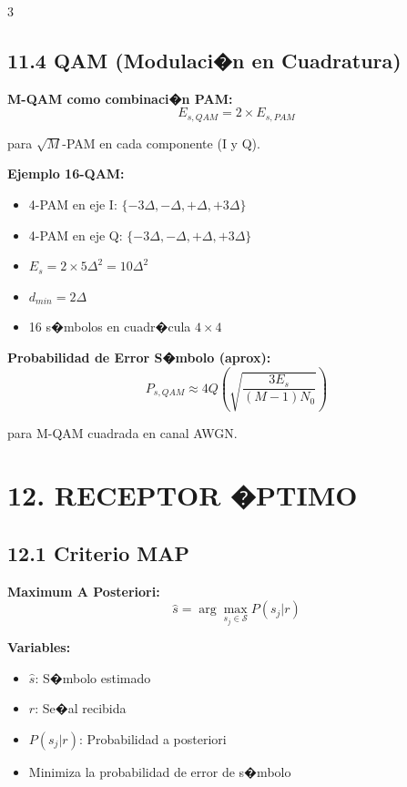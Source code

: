 ﻿\documentclass[8pt,a4paper]{article}
\begin{document}
\begin{multicols}{3}
\vspace{-2mm}
\subsection*{\small 11.4 QAM (Modulaci�n en Cuadratura)}
\vspace{-2mm}

\textbf{M-QAM como combinaci�n PAM:}
\[
E_{s,QAM} = 2 \times E_{s,PAM}
\]

para $\sqrt{M}$-PAM en cada componente (I y Q).

\textbf{Ejemplo 16-QAM:}
\begin{itemize}[leftmargin=*,itemsep=0pt]
    \item 4-PAM en eje I: $\{-3\Delta, -\Delta, +\Delta, +3\Delta\}$
    \item 4-PAM en eje Q: $\{-3\Delta, -\Delta, +\Delta, +3\Delta\}$
    \item $E_s = 2 \times 5\Delta^2 = 10\Delta^2$
    \item $d_{min} = 2\Delta$
    \item 16 s�mbolos en cuadr�cula $4\times4$
\end{itemize}

\textbf{Probabilidad de Error S�mbolo (aprox):}
\[
P_{s,QAM} \approx 4Q\left(\sqrt{\frac{3E_s}{(M-1)N_0}}\right)
\]

para M-QAM cuadrada en canal AWGN.

\vspace{-2mm}
\section*{\color{sectioncolor}\normalsize 12. RECEPTOR �PTIMO}
\vspace{-3mm}

\subsection*{\small 12.1 Criterio MAP}
\vspace{-2mm}

\textbf{Maximum A Posteriori:}
\[
\hat{s} = \arg\max_{s_j \in \mathcal{S}} P(s_j | r)
\]

\textbf{Variables:}
\begin{itemize}[leftmargin=*,itemsep=0pt]
    \item $\hat{s}$: S�mbolo estimado
    \item $r$: Se�al recibida
    \item $P(s_j | r)$: Probabilidad a posteriori
    \item Minimiza la probabilidad de error de s�mbolo
\end{itemize}


\end{multicols}
\end{document}
